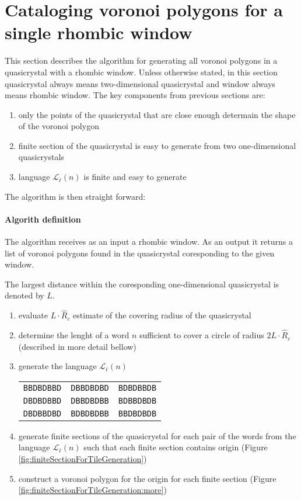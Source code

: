 \documentclass[text.tex]{subfiles}
\begin{document}
\section{Cataloging voronoi polygons for a single rhombic window}
This section describes the algorithm for generating all voronoi polygons in a quasicrystal with a rhombic window. Unless otherwise stated, in this section quasicrystal always means two-dimensional quasicrystal and window always means rhombic window. The key components from previous sections are:

\begin{enumerate}
\item only the points of the quasicrystal that are close enough determain the shape of the voronoi polygon
\item finite section of the quasicrystal is easy to generate from two one-dimensional quasicrystals
\item language $\mathcal{L}_{\ell}(n)$ is finite and easy to generate
\end{enumerate}

The algorithm is then straight forward:

\paragraph{Algorith definition} The algorithm receives as an input a rhombic window. As an output it returns a list of voronoi polygons found in the quasicrystal coresponding to the given window.

The largest distance within the coresponding one-dimensional quasicrystal is denoted by $L$. 

\begin{enumerate}
\item evaluate $L\cdot\hat{R}_c$ estimate of the covering radius of the quasicrystal
\item determine the lenght of a word $n$ sufficient to cover a circle of radius $2L\cdot\hat{R}_c$ (described in more detail bellow)
\item generate the language $\mathcal{L}_{\ell}(n)$

\begin{tabular}{ccc}
\texttt{BBDBDBBD} & \texttt{DBBDBDBD} & \texttt{BDBDBBDB} \\
\texttt{DBDBDBBD} & \texttt{DBBDBDBB} & \texttt{BDBBDBDB} \\
\texttt{DBDBBDBD} & \texttt{BDBDBDBB} & \texttt{BBDBDBDB} \\
\end{tabular}
\item generate finite sections of the quasicrystal for each pair of the words from the language $\mathcal{L}_{\ell}(n)$ such that each finite section contains origin (Figure \ref{fig:finiteSectionForTileGeneration})
\item construct a voronoi polygon for the origin for each finite section (Figure \ref{fig:finiteSectionForTileGeneration:more})
\end{enumerate}
\end{document}
